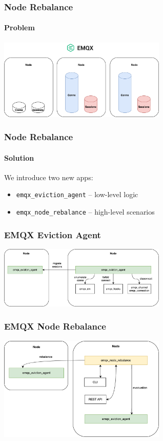 \documentclass{beamer}
\begin{document}
\begin{frame}
    \frametitle{Node Rebalance}
    \framesubtitle{Problem}

    \begin{center}
        \includegraphics[width=8cm, keepaspectratio]{images/rebalance-scheme.png}
    \end{center}
\end{frame}

\begin{frame}
    \frametitle{Node Rebalance}
    \framesubtitle{Solution}

    We introduce two new apps:
    \begin{itemize}
        \item \lstinline{emqx_eviction_agent} -- low-level logic
        \item \lstinline{emqx_node_rebalance} -- high-level scenarios
    \end{itemize}
\end{frame}

\begin{frame}
    \frametitle{EMQX Eviction Agent}
    \begin{center}
        \includegraphics[width=8cm, keepaspectratio]{images/eviction-agent.png}
    \end{center}
\end{frame}

\begin{frame}
    \frametitle{EMQX Node Rebalance}
    \begin{center}
        \includegraphics[width=8cm, keepaspectratio]{images/node-rebalance.png}
    \end{center}
\end{frame}
\end{document}
